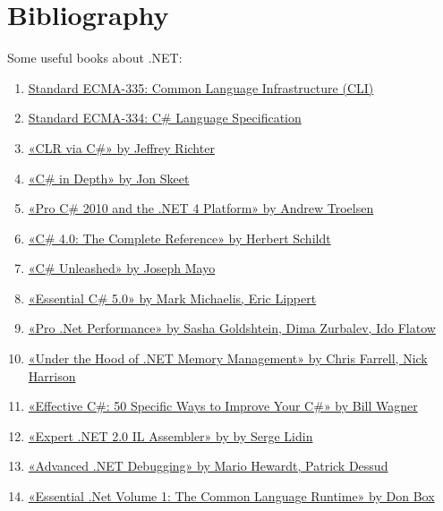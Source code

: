 \chapter*{Bibliography}
Some useful books about .NET:
\begin{enumerate}
  \item \href{http://www.ecma-international.org/publications/standards/Ecma-335.htm}{Standard ECMA-335: Common Language Infrastructure (CLI)}
  \item \href{http://www.ecma-international.org/publications/standards/Ecma-334.htm}{Standard ECMA-334: C\# Language Specification}
  \item \href{https://www.goodreads.com/book/show/16033480-clr-via-c}{«CLR via C\#» by Jeffrey Richter}
  \item \href{https://www.goodreads.com/book/show/7789280-c-in-depth}{«C\# in Depth» by Jon Skeet}
  \item \href{https://www.goodreads.com/book/show/6503209-pro-c-2010-and-the-net-4-platform}{«Pro C\# 2010 and the .NET 4 Platform» by Andrew Troelsen}
  \item \href{https://www.goodreads.com/book/show/8288195-c-4-0}{«C\# 4.0: The Complete Reference» by Herbert Schildt}
  \item \href{https://www.goodreads.com/book/show/5704305-c-unleashed}{«C\# Unleashed» by Joseph Mayo}
  \item \href{https://www.goodreads.com/book/show/15858119-essential-c-5-0}{«Essential C\# 5.0» by Mark Michaelis, Eric Lippert}
  \item \href{https://www.goodreads.com/book/show/15870849-pro-net-performance}{«Pro .Net Performance» by Sasha Goldshtein, Dima Zurbalev, Ido Flatow}
  \item \href{https://www.goodreads.com/book/show/13556198-under-the-hood-of-net-memory-management}{«Under the Hood of .NET Memory Management» by Chris Farrell, Nick Harrison}
  \item \href{https://www.goodreads.com/book/show/7926938-effective-c-covers-c-4-0}{«Effective C\#: 50 Specific Ways to Improve Your C\#» by Bill Wagner}
  \item \href{https://www.goodreads.com/book/show/1063672.Expert_NET_2_0_IL_Assembler}{«Expert .NET 2.0 IL Assembler» by by Serge Lidin}
  \item \href{https://www.goodreads.com/book/show/7306509-advanced-net-debugging}{«Advanced .NET Debugging» by Mario Hewardt, Patrick Dessud}
  \item \href{https://www.goodreads.com/book/show/1670159.Essential_Net_Volume_1}{«Essential .Net Volume 1: The Common Language Runtime» by Don Box}
\end{enumerate}